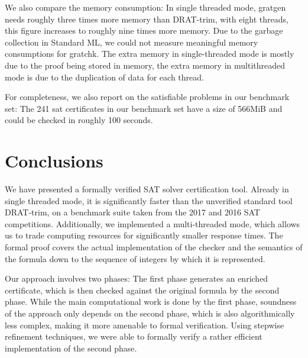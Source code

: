 \documentclass[smallcondensed]{svjour3}     %
\begin{document}
  We also compare the memory consumption: In single threaded mode, gratgen needs roughly three times more memory than DRAT-trim, with eight threads, this figure increases to 
  roughly nine times more memory. Due to the garbage collection in Standard ML, we could not measure meaningful memory consumptions for gratchk.
  The extra memory in single-threaded mode is mostly due to the proof being stored in memory, the extra memory in multithreaded mode is due to the duplication of data for each thread.
  
  For completeness, we also report on the satisfiable problems in our benchmark set: The 241 sat certificates in our benchmark set have a size of 566MiB and could be
  checked in roughly 100 seconds.

  
  
  

\section{Conclusions}\label{sec:concl}


We have presented a formally verified SAT solver certification tool. 
Already in single threaded mode, it is significantly faster than the unverified standard tool DRAT-trim, on a benchmark 
suite taken from the 2017 and 2016 SAT competitions.
Additionally, we implemented a multi-threaded mode, 
which allows us to trade computing resources for significantly smaller response times.
The formal proof covers the actual implementation of the checker and the semantics of the 
formula down to the sequence of integers by which it is represented.

Our approach involves two phases: The first phase generates an enriched certificate, 
which is then checked against the original formula by the second phase.
While the main computational work is done by the first phase, soundness of the approach 
only depends on the second phase, which is also algorithmically less complex, making it more amenable to formal verification. 
Using stepwise refinement techniques, we were able to formally verify a rather efficient implementation of the second phase.
\end{document}
